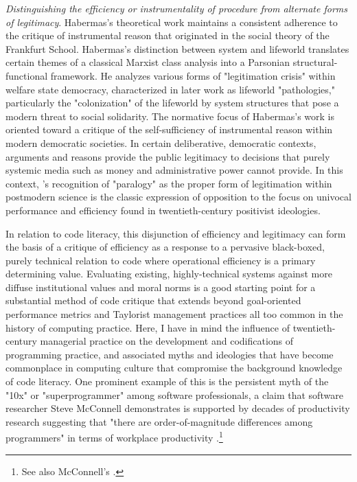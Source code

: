 \emph{Distinguishing the efficiency or instrumentality of procedure from alternate forms of legitimacy}. Habermas's theoretical work maintains a consistent adherence to the critique of instrumental reason that originated in the social theory of the Frankfurt School. Habermas's distinction between system and lifeworld translates certain themes of a classical Marxist class analysis into a Parsonian structural-functional framework. He analyzes various forms of "legitimation crisis" within welfare state democracy, characterized in later work as lifeworld "pathologies," particularly the "colonization" of the lifeworld by system structures that pose a modern threat to social solidarity. The normative focus of Habermas's work is oriented toward a critique of the self-sufficiency of instrumental reason within modern democratic societies. In certain deliberative, democratic contexts, arguments and reasons provide the public legitimacy to decisions that purely systemic media such as money and administrative power cannot provide. In this context, \citeauthor{Lyotard1984-kb}'s recognition of "paralogy" as the proper form of legitimation within postmodern science \autocite[60--66]{Lyotard1984-kb} is the classic expression of opposition to the focus on univocal performance and efficiency found in twentieth-century positivist ideologies.

In relation to code literacy, this disjunction of efficiency and legitimacy can form the basis of a critique of efficiency as a response to a pervasive black-boxed, purely technical relation to code where operational efficiency is a primary determining value. Evaluating existing, highly-technical systems against more diffuse institutional values and moral norms is a good starting point for a substantial method of code critique that extends beyond goal-oriented performance metrics and Taylorist management practices all too common in the history of computing practice. Here, I have in mind the influence of twentieth-century managerial practice on the development and codifications of programming practice, and associated myths and ideologies that have become commonplace in computing culture that compromise the background knowledge of code literacy. One prominent example of this is the persistent myth of the "10x" or "superprogrammer" among software professionals, a claim that software researcher Steve McConnell demonstrates is supported by decades of productivity research suggesting that "there are order-of-magnitude differences among programmers" in terms of workplace productivity \autocite*{McConnell10}.\footnote{See also McConnell's \autocite*{OriginOf10x}.}

